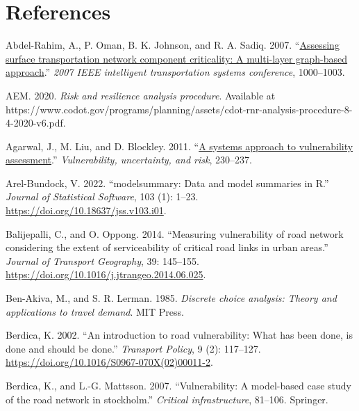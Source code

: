 \documentclass[]{ascelike-new}
\newlength{\cslhangindent}
\newenvironment{CSLReferences}[2] %
 {\begin{list}{}{%
  \setlength{\itemindent}{0pt}
  \setlength{\leftmargin}{0pt}
  \setlength{\parsep}{0pt}
  \ifodd #1
   \setlength{\leftmargin}{\cslhangindent}
   \setlength{\itemindent}{-1\cslhangindent}
  \fi
  \setlength{\itemsep}{#2\baselineskip}}}
 {\end{list}}
\begin{document}

\section*{References}\label{references}


\label{refs}
\begin{CSLReferences}{1}{0}
Abdel-Rahim, A., P. Oman, B. K. Johnson, and R. A. Sadiq. 2007.
{``\href{https://doi.org/10.1109/ITSC.2007.4357801}{Assessing surface
transportation network component criticality: A multi-layer graph-based
approach}.''} \emph{2007 IEEE intelligent transportation systems
conference}, 1000--1003.

AEM. 2020. \emph{Risk and resilience analysis procedure}. Available at
https://www.codot.gov/programs/planning/assets/cdot-rnr-analysis-procedure-8-4-2020-v6.pdf.

Agarwal, J., M. Liu, and D. Blockley. 2011.
{``\href{https://doi.org/10.1061/41170(400)28}{A systems approach to
vulnerability assessment}.''} \emph{Vulnerability, uncertainty, and
risk}, 230--237.

Arel-Bundock, V. 2022. {``{modelsummary}: Data and model summaries in
{R}.''} \emph{Journal of Statistical Software}, 103 (1): 1--23.
\url{https://doi.org/10.18637/jss.v103.i01}.

Balijepalli, C., and O. Oppong. 2014. {``Measuring vulnerability of road
network considering the extent of serviceability of critical road links
in urban areas.''} \emph{Journal of Transport Geography}, 39: 145--155.
\url{https://doi.org/10.1016/j.jtrangeo.2014.06.025}.

Ben-Akiva, M., and S. R. Lerman. 1985. \emph{Discrete choice analysis:
Theory and applications to travel demand}. MIT Press.

Berdica, K. 2002. {``An introduction to road vulnerability: What has
been done, is done and should be done.''} \emph{Transport Policy}, 9
(2): 117--127. \url{https://doi.org/10.1016/S0967-070X(02)00011-2}.

Berdica, K., and L.-G. Mattsson. 2007. {``Vulnerability: A model-based
case study of the road network in stockholm.''} \emph{Critical
infrastructure}, 81--106. Springer.


\end{CSLReferences}
\end{document}
